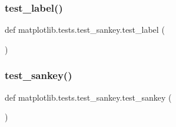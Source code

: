 \subsubsection{\texorpdfstring{test\+\_\+label()}{test\_label()}}
{\footnotesize\ttfamily def matplotlib.\+tests.\+test\+\_\+sankey.\+test\+\_\+label (\begin{DoxyParamCaption}{ }\end{DoxyParamCaption})}

\mbox{\label{namespacematplotlib_1_1tests_1_1test__sankey_a1f2199579a60f44bfa7b4fdcf5995587}} 
\subsubsection{\texorpdfstring{test\+\_\+sankey()}{test\_sankey()}}
{\footnotesize\ttfamily def matplotlib.\+tests.\+test\+\_\+sankey.\+test\+\_\+sankey (\begin{DoxyParamCaption}{ }\end{DoxyParamCaption})}

